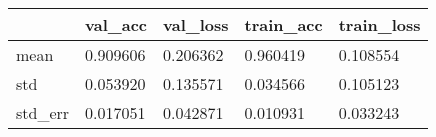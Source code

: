\begin{tabular}{|l|l|l|l|l|}
\toprule \hline
 & val\_acc & val\_loss & train\_acc & train\_loss \\ \hline
\midrule
mean & 0.909606 & 0.206362 & 0.960419 & 0.108554 \\ \hline
std & 0.053920 & 0.135571 & 0.034566 & 0.105123 \\ \hline
std\_err & 0.017051 & 0.042871 & 0.010931 & 0.033243 \\ \hline
\bottomrule
\end{tabular}
